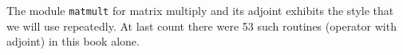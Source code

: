 The module \texttt{matmult}
for matrix multiply and its adjoint
exhibits the style that we will use repeatedly.
At last count there were 53 such routines
(operator with adjoint)
in this book alone.
\begin{comment}
Notice that the module \texttt{matmult}
does not explicitly erase its output before it begins,
as does the psuedo code.
That is because Loptran will always erase for you
the space required for the operator's output.
Loptran also defines a logical variable {\tt adj}
for you to distinguish your computation of the adjoint
$\bold x=\bold x+\bold B\T \bold y$
from the forward operation
$\bold y=\bold y+\bold B\bold x$. 
In computerese, the two lines beginning \#\% are macro expansions
that take compact bits of information which expand
into the verbose boilerplate that Fortran requires.
Loptran is Fortran with these macro expansions.
You can always see how they expand by looking at
\texttt{http://sep.stanford.edu/sep/prof/}.

\par
What is new in Fortran 90, and will be a big help to us,
is that instead of a subroutine with a single entry.
\end{comment}

